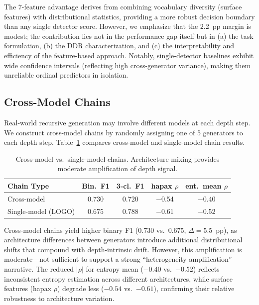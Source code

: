 \documentclass[11pt,a4paper]{article}
\begin{document}
The 7-feature advantage derives from combining vocabulary diversity (surface features) with distributional statistics, providing a more robust decision boundary than any single detector score.
However, we emphasize that the 2.2~pp margin is modest; the contribution lies not in the performance gap itself but in (a) the task formulation, (b) the DDR characterization, and (c) the interpretability and efficiency of the feature-based approach.
Notably, single-detector baselines exhibit wide confidence intervals (reflecting high cross-generator variance), making them unreliable ordinal predictors in isolation.

\subsection{Cross-Model Chains}
\label{sec:cross_model}

Real-world recursive generation may involve different models at each depth step.
We construct cross-model chains by randomly assigning one of 5 generators to each depth step.
Table~\ref{tab:cross_model} compares cross-model and single-model chain results.

\begin{table}[t]
\centering
\small
\caption{Cross-model vs.\ single-model chains. Architecture mixing provides moderate amplification of depth signal.}
\label{tab:cross_model}
\begin{tabular}{lcccc}
\toprule
\textbf{Chain Type} & \textbf{Bin.\ F1} & \textbf{3-cl.\ F1} & \textbf{hapax $\rho$} & \textbf{ent.\ mean $\rho$} \\
\midrule
Cross-model & 0.730 & 0.720 & $-$0.54 & $-$0.40 \\
Single-model (LOGO) & 0.675 & 0.788 & $-$0.61 & $-$0.52 \\
\bottomrule
\end{tabular}
\end{table}

Cross-model chains yield higher binary F1 (0.730 vs.\ 0.675, $\Delta = 5.5$~pp), as architecture differences between generators introduce additional distributional shifts that compound with depth-intrinsic drift.
However, this amplification is moderate---not sufficient to support a strong ``heterogeneity amplification'' narrative.
The reduced $|\rho|$ for entropy mean ($-0.40$ vs.\ $-0.52$) reflects inconsistent entropy estimation across different architectures, while surface features (hapax $\rho$) degrade less ($-0.54$ vs.\ $-0.61$), confirming their relative robustness to architecture variation.
\end{document}
